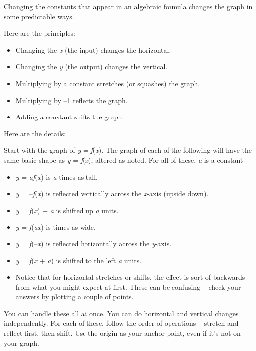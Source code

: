 Changing the constants that appear in an algebraic formula changes the
graph in some predictable ways.

Here are the principles:

\begin{itemize}
\item
  Changing the \emph{x} (the input) changes the horizontal.
\item
  Changing the \emph{y} (the output) changes the vertical.
\item
  Multiplying by a constant stretches (or squashes) the graph.
\item
  Multiplying by --1 reflects the graph.
\item
  Adding a constant shifts the graph.
\end{itemize}

Here are the details:

Start with the graph of \emph{y} = \emph{f}(\emph{x}). The graph of each
of the following will have the same basic shape as \emph{y} =
\emph{f}(\emph{x}), altered as noted. For all of these, \emph{a} is a
constant

\begin{itemize}
\item
  \emph{y} = \emph{af}(\emph{x}) is \emph{a} times as tall.
\item
  \emph{y} = --\emph{f}(\emph{x}) is reflected vertically across the
  \emph{x}-axis (upside down).
\item
  \emph{y} = \emph{f}(\emph{x}) + \emph{a} is shifted up \emph{a} units.
\item
  \emph{y} = \emph{f}(\emph{ax}) is times as wide.
\item
  \emph{y} = \emph{f}(--\emph{x}) is reflected horizontally across the
  \emph{y}-axis.
\item
  \emph{y} = \emph{f}(\emph{x} + \emph{a}) is shifted to the left
  \emph{a} units.
\item
  Notice that for horizontal stretches or shifts, the effect is sort of
  backwards from what you might expect at first. These can be confusing
  -- check your answers by plotting a couple of points.
\end{itemize}

You can handle these all at once. You can do horizontal and vertical
changes independently. For each of these, follow the order of operations
-- stretch and reflect first, then shift. Use the origin as your anchor
point, even if it's not on your graph.

